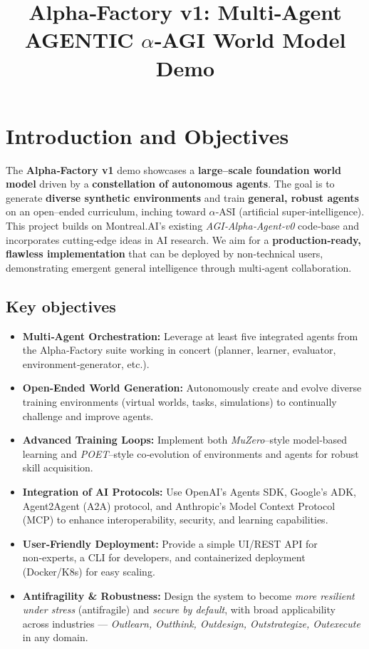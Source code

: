 \documentclass{article}
\begin{document}
\title{\textbf{Alpha‑Factory v1: Multi‑Agent AGENTIC $\alpha$‑AGI World Model Demo}}
\date{}
\maketitle

\section*{Introduction and Objectives}

The \textbf{Alpha‑Factory v1} demo showcases a \textbf{large--scale foundation world model} driven by a \textbf{constellation of autonomous agents}. 
The goal is to generate \textbf{diverse synthetic environments} and train \textbf{general, robust agents} on an open--ended curriculum, inching toward $\alpha$‑ASI (artificial super‑intelligence). 
This project builds on Montreal.AI's existing \textit{AGI‑Alpha‑Agent‑v0} code‑base and incorporates cutting‑edge ideas in AI research. 
We aim for a \textbf{production‑ready, flawless implementation} that can be deployed by non‑technical users, demonstrating emergent general intelligence through multi‑agent collaboration.

\subsection*{Key objectives}

\begin{itemize}[leftmargin=*]
  \item \textbf{Multi‑Agent Orchestration:} Leverage at least five integrated agents from the Alpha‑Factory suite working in concert (planner, learner, evaluator, environment‑generator, etc.).
  \item \textbf{Open‑Ended World Generation:} Autonomously create and evolve diverse training environments (virtual worlds, tasks, simulations) to continually challenge and improve agents.
  \item \textbf{Advanced Training Loops:} Implement both \textit{MuZero}--style model‑based learning and \textit{POET}--style co‑evolution of environments and agents for robust skill acquisition.
  \item \textbf{Integration of AI Protocols:} Use OpenAI's Agents SDK, Google's ADK, Agent2Agent (A2A) protocol, and Anthropic's Model Context Protocol (MCP) to enhance interoperability, security, and learning capabilities.
  \item \textbf{User‑Friendly Deployment:} Provide a simple UI/REST API for non‑experts, a CLI for developers, and containerized deployment (Docker/K8s) for easy scaling.
  \item \textbf{Antifragility \& Robustness:} Design the system to become \textit{more resilient under stress} (antifragile) and \textit{secure by default}, with broad applicability across industries --- \textit{Outlearn, Outthink, Outdesign, Outstrategize, Outexecute} in any domain.
\end{itemize}
\end{document}
